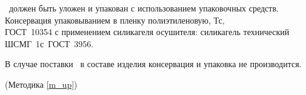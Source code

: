 \dut \ должен быть уложен и упакован с использованием упаковочных средств. Консервация упаковыванием в пленку полиэтиленовую, Тс, \\ ГОСТ~10354 с применением силикагеля осушителя: силикагель технический \\ ШСМГ~1с~ГОСТ~3956.

В случае поставки \dut \ в составе изделия консервация и упаковка не производится.

\begin{flushright}
	(Методика \ref{m_up})
\end{flushright}